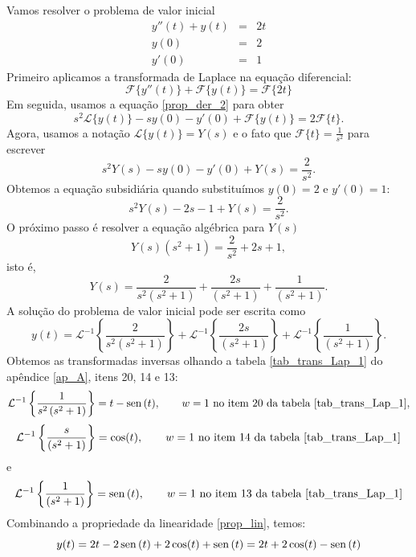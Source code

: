 \begin{ex}Vamos resolver o problema de valor inicial
\begin{eqnarray*}
 y''(t)+y(t)&=&2t\\
y(0)&=&2\\
y'(0)&=&1
\end{eqnarray*}
Primeiro aplicamos a transformada de Laplace na equação diferencial:
  \begin{equation}
 \mathcal{F}\{y''(t)\}+\mathcal{F}\{y(t)\}=\mathcal{F}\{2t\}
 \end{equation}
 Em seguida, usamos a equação \ref{prop_der_2} para obter
  \begin{equation}
s^2 \mathcal{L }\{ y(t)\}-sy(0)-y'(0)+\mathcal{F}\{y(t)\}=2\mathcal{F}\{t\}.
 \end{equation}
 Agora, usamos a notação $\mathcal{L }\{ y(t)\}=Y(s)$ e o fato que $\mathcal{F}\{t\}=\frac{1}{s^2}$ para escrever
  \begin{equation}
s^2 Y(s)-sy(0)-y'(0)+Y(s)=\frac{2}{s^2}.
 \end{equation}
 Obtemos a equação subsidiária quando substituímos $y(0)=2$ e $y'(0)=1$:
  \begin{equation}
s^2 Y(s)-2s-1+Y(s)=\frac{2}{s^2}.
 \end{equation}
 O próximo passo é resolver a equação algébrica para $Y(s)$
  \begin{equation}
 Y(s)\left(s^2+1\right)=\frac{2}{s^2}+2s+1,
 \end{equation}
 isto é,
  \begin{equation}
 Y(s)=\frac{2}{s^2\left(s^2+1\right)}+\frac{2s}{\left(s^2+1\right)}+\frac{1}{\left(s^2+1\right)}.
 \end{equation}
 A solução do problema de valor inicial pode ser escrita como
 \begin{equation}
y(t)=\mathcal{L}^{-1}\left\{\frac{2}{s^2\left(s^2+1\right)}\right\}+\mathcal{L}^{-1}\left\{\frac{2s}{\left(s^2+1\right)}\right\}+\mathcal{L}^{-1}\left\{\frac{1}{\left(s^2+1\right)}\right\}.
\end{equation}
 Obtemos as transformadas inversas olhando a tabela \ref{tab_trans_Lap_1} do apêndice \ref{ap_A}, itens 20, 14 e 13:
  \begin{equation}
 \mathcal{L}^{-1}\left\{\frac{1}{s^2\left(s^2+1\right)}\right\}=t-\operatorname{sen}\,(t),\qquad w=1\ \hbox{no item 20 da tabela \ref{tab_trans_Lap_1}}, \end{equation}
  \begin{equation}
 \mathcal{L}^{-1}\left\{\frac{s}{\left(s^2+1\right)}\right\}=\cos(t),\qquad w=1\ \hbox{no item 14 da tabela \ref{tab_trans_Lap_1}}
 \end{equation}
 e
  \begin{equation}
 \mathcal{L}^{-1}\left\{\frac{1}{\left(s^2+1\right)}\right\}=\operatorname{sen}\,(t),\qquad w=1\ \hbox{no item 13 da tabela \ref{tab_trans_Lap_1}}
 \end{equation}
 Combinando a propriedade da linearidade \ref{prop_lin}, temos:
  \begin{equation}
y(t)=2t-2\operatorname{sen}\,(t)+2\cos(t)+\operatorname{sen}\,(t)=2t+2\cos(t)-\operatorname{sen}\,(t)
\end{equation}
 \end{ex}
